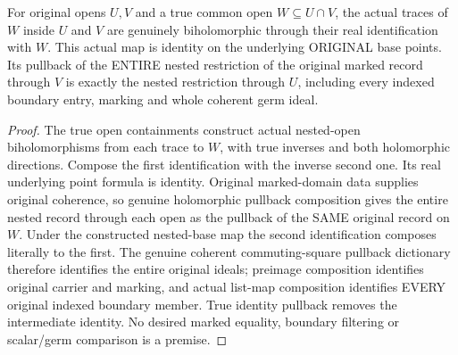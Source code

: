 \begin{lemma}
\label{hir:original-terminal-overlap-whole-nested-marked-dictionary}
\leanok
For original opens $U,V$ and a true common open $W\subseteq U\cap V$,
the actual traces of $W$ inside $U$ and $V$ are genuinely biholomorphic
through their real identification with $W$. This actual map is identity
on the underlying ORIGINAL base points. Its pullback of the ENTIRE
nested restriction of the original marked record through $V$ is exactly
the nested restriction through $U$, including every indexed boundary
entry, marking and whole coherent germ ideal.
\end{lemma}
\begin{proof}
The true open containments construct actual nested-open biholomorphisms
from each trace to $W$, with true inverses and both holomorphic directions.
Compose the first identification with the inverse second one. Its real
underlying point formula is identity. Original marked-domain data supplies
original coherence, so genuine holomorphic pullback composition gives the
entire nested record through each open as the pullback of the SAME original
record on $W$. Under the constructed nested-base map the second identification
composes literally to the first. The genuine coherent commuting-square
pullback dictionary therefore identifies the entire original ideals;
preimage composition identifies original carrier and marking, and actual
list-map composition identifies EVERY original indexed boundary member.
True identity pullback removes the intermediate identity. No desired
marked equality, boundary filtering or scalar/germ comparison is a premise.
\end{proof}

